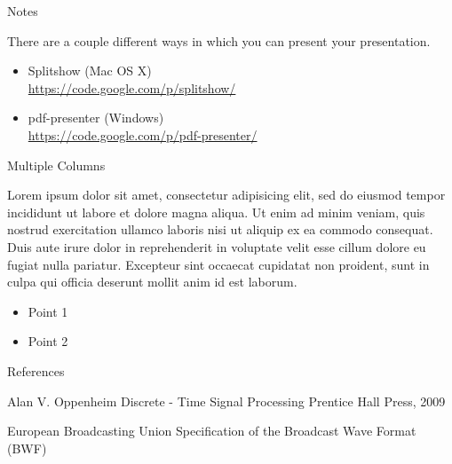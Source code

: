 \documentclass[compress]{beamer}
\begin{document}

\begin{frame}{Notes}
    
    There are a couple different ways in which you can present your presentation.

	\begin{itemize}
		\item Splitshow (Mac OS X)\\\url{https://code.google.com/p/splitshow/}
		\item pdf-presenter (Windows)\\\url{https://code.google.com/p/pdf-presenter/}
	\end{itemize}
\end{frame}



\begin{frame}{Multiple Columns}
	\begin{multicols}{2}
		Lorem ipsum dolor sit amet, consectetur adipisicing elit, sed do eiusmod
		tempor incididunt ut labore et dolore magna aliqua. Ut enim ad minim veniam,
		quis nostrud exercitation ullamco laboris nisi ut aliquip ex ea commodo
		consequat. Duis aute irure dolor in reprehenderit in voluptate velit esse
		cillum dolore eu fugiat nulla pariatur. Excepteur sint occaecat cupidatat non
		proident, sunt in culpa qui officia deserunt mollit anim id est laborum.
		\begin{itemize}
        	\item Point 1
        	\item Point 2
		\end{itemize}
	\end{multicols}
\end{frame}

\begin{frame}{References}
	\begin{thebibliography}{10}
    
	\beamertemplatebookbibitems
	Alan V. Oppenheim
	\newblock Discrete - Time Signal Processing
	\newblock Prentice Hall Press, 2009

	\beamertemplatearticlebibitems
	European Broadcasting Union
	\newblock Specification of the Broadcast Wave Format (BWF)
  \end{thebibliography}
\end{frame}
\end{document}
